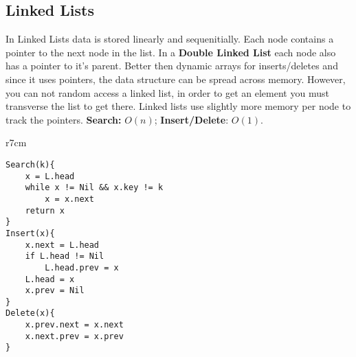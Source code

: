 \documentclass{article}
\begin{document}

\subsection{Linked Lists}
In Linked Lists data is stored linearly and sequenitially. Each node contains a pointer to the next node in the list. In a {\bf Double Linked List} each node also has a pointer to it's parent. Better then dynamic arrays for inserts/deletes and since it uses pointers, the data structure can be spread across memory. However, you can not random access a linked list, in order to get an element you must transverse the list to get there. Linked lists use slightly more memory per node to track the pointers. {\bf Search:} $O(n)$; {\bf Insert/Delete}: $O(1)$.

\begin{wrapfigure}{r}{7cm}
\end{wrapfigure}

\begin{lstlisting}[style=pseudo]
Search(k){
	x = L.head
	while x != Nil && x.key != k
		x = x.next
	return x
}
Insert(x){
	x.next = L.head
	if L.head != Nil
		L.head.prev = x
	L.head = x
	x.prev = Nil
}
Delete(x){
	x.prev.next = x.next
	x.next.prev = x.prev
}
\end{lstlisting}



\end{document}

